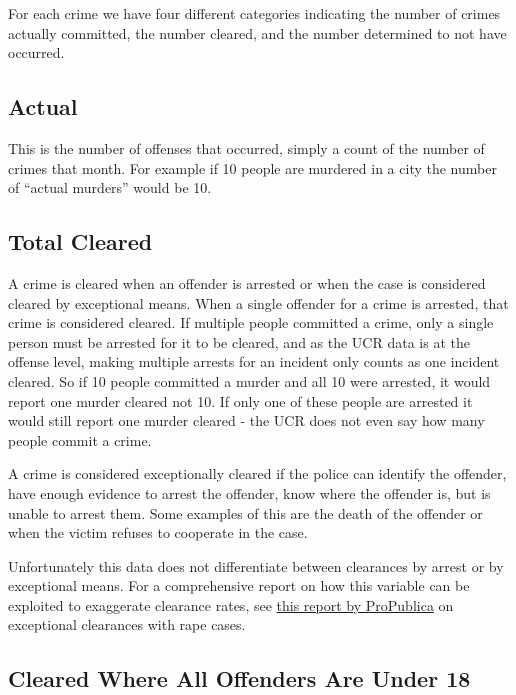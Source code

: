 \documentclass[
  12pt,
]{book}
\begin{document}
For each crime we have four different categories indicating the number of crimes actually committed, the number cleared, and the number determined to not have occurred.

\hypertarget{actual}{%
\subsection{Actual}\label{actual}}

This is the number of offenses that occurred, simply a count of the number of crimes that month. For example if 10 people are murdered in a city the number of ``actual murders'' would be 10.

\hypertarget{total-cleared}{%
\subsection{Total Cleared}\label{total-cleared}}

A crime is cleared when an offender is arrested or when the case is considered cleared by exceptional means. When a single offender for a crime is arrested, that crime is considered cleared. If multiple people committed a crime, only a single person must be arrested for it to be cleared, and as the UCR data is at the offense level, making multiple arrests for an incident only counts as one incident cleared. So if 10 people committed a murder and all 10 were arrested, it would report one murder cleared not 10. If only one of these people are arrested it would still report one murder cleared - the UCR does not even say how many people commit a crime.

A crime is considered exceptionally cleared if the police can identify the offender, have enough evidence to arrest the offender, know where the offender is, but is unable to arrest them. Some examples of this are the death of the offender or when the victim refuses to cooperate in the case.

Unfortunately this data does not differentiate between clearances by arrest or by exceptional means. For a comprehensive report on how this variable can be exploited to exaggerate clearance rates, see \href{https://www.propublica.org/article/when-it-comes-to-rape-just-because-a-case-is-cleared-does-not-mean-solved}{this report by ProPublica} on exceptional clearances with rape cases.

\hypertarget{cleared-where-all-offenders-are-under-18}{%
\subsection{Cleared Where All Offenders Are Under 18}\label{cleared-where-all-offenders-are-under-18}}
\end{document}
